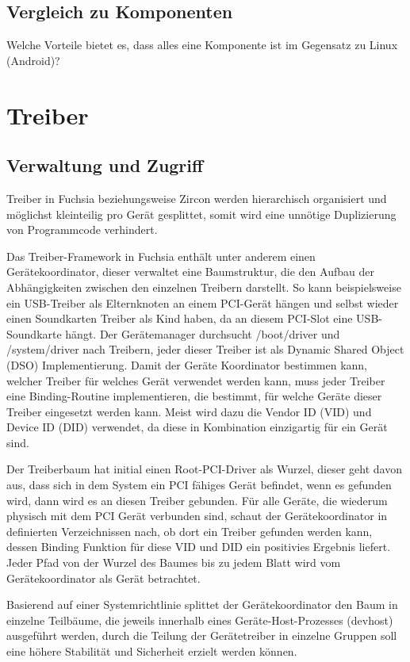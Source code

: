 \documentclass[a4paper]{scrartcl}
\begin{document}
\subsection{Vergleich zu Komponenten}
Welche Vorteile bietet es, dass alles eine Komponente ist im Gegensatz zu Linux (Android)?
\section{Treiber}
\subsection{Verwaltung und Zugriff}
Treiber in Fuchsia beziehungsweise Zircon werden hierarchisch organisiert und möglichst kleinteilig pro Gerät gesplittet, somit wird eine unnötige Duplizierung von Programmcode verhindert.

Das Treiber-Framework in Fuchsia enthält unter anderem einen Gerätekoordinator, dieser verwaltet eine Baumstruktur, die den Aufbau der Abhängigkeiten zwischen den einzelnen Treibern darstellt. So kann beispielsweise ein USB-Treiber als Elternknoten an einem PCI-Gerät hängen und selbst wieder einen Soundkarten Treiber als Kind haben, da an diesem PCI-Slot eine USB-Soundkarte hängt. Der Gerätemanager durchsucht /boot/driver und /system/driver nach Treibern, jeder dieser Treiber ist als Dynamic Shared Object (DSO) Implementierung. Damit der Geräte Koordinator bestimmen kann, welcher Treiber für welches Gerät verwendet werden kann, muss jeder Treiber eine Binding-Routine implementieren, die bestimmt, für welche Geräte dieser Treiber eingesetzt werden kann. Meist wird dazu die Vendor ID (VID) und Device ID (DID) verwendet, da diese in Kombination einzigartig für ein Gerät sind. 

Der Treiberbaum hat initial einen Root-PCI-Driver als Wurzel, dieser geht davon aus, dass sich in dem System ein PCI fähiges Gerät befindet, wenn es gefunden wird, dann wird es an diesen Treiber gebunden. Für alle Geräte, die wiederum physisch mit dem PCI Gerät verbunden sind, schaut der Gerätekoordinator in definierten Verzeichnissen nach, ob dort ein Treiber gefunden werden kann, dessen Binding Funktion für diese VID und DID ein positivies Ergebnis liefert. Jeder Pfad von der Wurzel des Baumes bis zu jedem Blatt wird vom Gerätekoordinator als Gerät betrachtet.

Basierend auf einer Systemrichtlinie splittet der Gerätekoordinator den Baum in einzelne Teilbäume, die jeweils innerhalb eines Geräte-Host-Prozesses (devhost) ausgeführt werden, durch die Teilung der Gerätetreiber in einzelne Gruppen soll eine höhere Stabilität und Sicherheit erzielt werden können.
\end{document}
